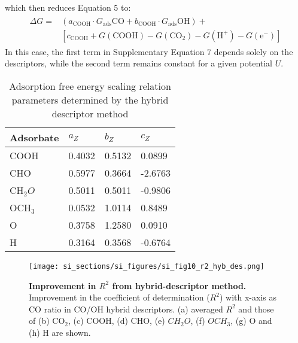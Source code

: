 which then reduces Equation 5 to:
\begin{align}
  \begin{split}
    \Delta G = &(a_{\text{COOH}} \cdot G_{\text{ads}}{\mathrm{CO}} + b_{\text{COOH}} \cdot G_{\text{ads}}{\mathrm{OH}}) + \\
    &[c_{\text{COOH}} + G(\mathrm{COOH}) - G(\mathrm{CO}_2) - G(\mathrm{H}^+) - G(\mathrm{e}^-)]
  \end{split}
\end{align}
In this case, the first term in Supplementary Equation 7 depends solely on the descriptors, while the second term remains constant for a given potential $U$.


\begin{table}[h]
  \centering
  {\fontsize{10}{12}\selectfont
  \begin{tabular}{*{4}{l}}
    \hline
    \textbf{Adsorbate} & \textbf{$a_Z$}  & \textbf{$b_Z$}  & \textbf{$c_Z$}   \\
    \hline
    COOH      & 0.4032 & 0.5132 & 0.0899  \\
    CHO       & 0.5977 & 0.3664 & -2.6763 \\
    CH$_2O$   & 0.5011 & 0.5011 & -0.9806 \\
    OCH$_3$   & 0.0532 & 1.0114 & 0.8489  \\
    O         & 0.3758 & 1.2580 & 0.0910  \\
    H         & 0.3164 & 0.3568 & -0.6764 \\
    \hline
  \end{tabular}
  }
  \caption{Adsorption free energy scaling relation parameters determined by the hybrid descriptor method}
  \label{si_table13}
\end{table}


\begin{figure}
  \centering
  \texttt{[image: si\_sections/si\_figures/si\_fig10\_r2\_hyb\_des.png]}
  \caption{\textbf{Improvement in $R^2$ from hybrid-descriptor method.}
  Improvement in the coefficient of determination ($R^2$) with x-axis as CO ratio in CO/OH hybrid descriptors.
  (a) averaged $R^2$ and those of (b) CO$_2$, (c) COOH, (d) CHO, (e) $CH_2O$, (f) $OCH_3$, (g) O and (h) H are shown.}
  \label{si_fig10:r2_hyb_des}
\end{figure}


